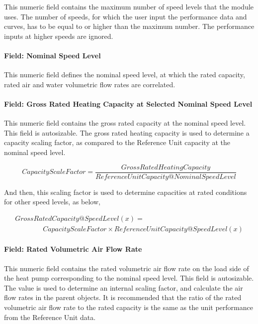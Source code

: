 This numeric field contains the maximum number of speed levels that the module uses. The number of speeds, for which the user input the performance data and curves, has to be equal to or higher than the maximum number. The performance inputs at higher speeds are ignored.

\paragraph{Field: Nominal Speed Level}\label{field-nominal-speed-level-3}

This numeric field defines the nominal speed level, at which the rated capacity, rated air and water volumetric flow rates are correlated.

\paragraph{Field: Gross Rated Heating Capacity at Selected Nominal Speed Level}\label{field-gross-rated-heating-capacity-at-selected-nominal-speed-level-1}

This numeric field contains the gross rated capacity at the nominal speed level. This field is autosizable. The gross rated heating capacity is used to determine a capacity scaling factor, as compared to the Reference Unit capacity at the nominal speed level.

\begin{equation}
CapacityScaleFactor = \frac{{GrossRatedHeatingCapacity}}{{ReferenceUnitCapacity@NominalSpeedLevel}}
\end{equation}

And then, this scaling factor is used to determine capacities at rated conditions for other speed levels, as below,

\begin{equation}
  \begin{array}{l}
    GrossRatedCapacity@SpeedLevel \left( x \right) = \\
    \quad \quad \quad \quad CapacityScaleFactor \times ReferenceUnitCapacity@SpeedLevel(x)
  \end{array}
\end{equation}

\paragraph{Field: Rated Volumetric Air Flow Rate}\label{field-rated-volumetric-air-flow-rate-2}

This numeric field contains the rated volumetric air flow rate on the load side of the heat pump corresponding to the nominal speed level. This field is autosizable. The value is used to determine an internal scaling factor, and calculate the air flow rates in the parent objects. It is recommended that the ratio of the rated volumetric air flow rate to the rated capacity is the same as the unit performance from the Reference Unit data.

